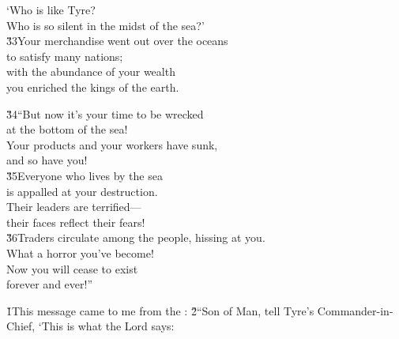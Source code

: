 \begin{poetry}
\poeml `Who is like Tyre? \\
\poemll    Who is so silent in the midst of the sea?' \\
\poeml \v{33}Your merchandise went out over the oceans \\
\poemll    to satisfy many nations; \\
\poeml with the abundance of your wealth \\
\poemll    you enriched the kings of the earth.
\end{poetry}

\begin{poetry}
\poeml \v{34}``But now it's your time to be wrecked \\
\poemll    at the bottom of the sea! \\
\poeml Your products and your workers have sunk, \\
\poemll    and so have you! \\
\poeml \v{35}Everyone who lives by the sea \\
\poemll    is appalled at your destruction. \\
\poeml Their leaders are terrified--- \\
\poemll    their faces reflect their fears! \\
\poeml \v{36}Traders circulate among the people, hissing at you. \\
\poemll    What a horror you've become! \\
\poeml Now you will cease to exist \\
\poemll    forever and ever!''
\end{poetry}

\v{1}This message came to me from the : \v{2}``Son of Man, tell Tyre's Commander-in-Chief, `This is what the Lord  says:


